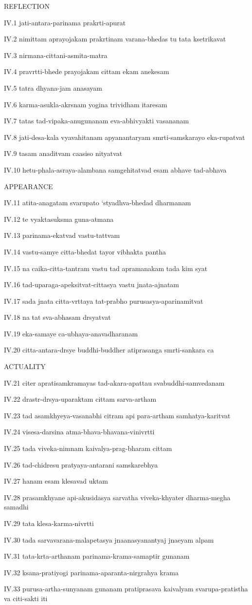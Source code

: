 REFLECTION

IV.1
jati-antara-parinama prakrti-apurat

IV.2
nimittam aprayojakam prakrtinam varana-bhedas tu tata ksetrikavat

IV.3
nirmana-cittani-asmita-matra

IV.4
pravrtti-bhede prayojakam cittam ekam anekesam

IV.5
tatra dhyana-jam anasayam

IV.6
karma-asukla-akrsnam yogina trividham itaresam

IV.7
tatas tad-vipaka-anugunanam eva-abhivyakti vasananam

IV.8
jati-desa-kala vyavahitanam apyanantaryam smrti-samskarayo eka-rupatvat

IV.9
tasam anaditvam caasiso nityatvat

IV.10
hetu-phala-asraya-alambana samgehitatvad esam abhave tad-abhava

APPEARANCE

IV.11
atita-anagatam svarupato ‘styadhva-bhedad dharmanam

IV.12
te vyaktasuksma guna-atmana

IV.13
parinama-ekatvad vastu-tattvam

IV.14
vastu-samye citta-bhedat tayor vibhakta pantha

IV.15
na caika-citta-tantram vastu tad apramanakam tada kim syat

IV.16
tad-uparaga-apeksitvat-cittasya vastu jnata-ajnatam

IV.17
sada jnata citta-vrttaya tat-prabho purusasya-aparinamitvat

IV.18
na tat sva-abhasam drsyatvat

IV.19
eka-samaye ca-ubhaya-anavadharanam

IV.20
citta-antara-drsye buddhi-buddher atiprasanga smrti-sankara ca

ACTUALITY

IV.21
citer apratisamkramayas tad-akara-apattau svabuddhi-samvedanam

IV.22
drastr-drsya-uparaktam cittam sarva-artham

IV.23
tad asamkhyeya-vasanabhi citram api para-artham samhatya-karitvat

IV.24
visesa-darsina atma-bhava-bhavana-vinivrtti

IV.25
tada viveka-nimnam kaivalya-prag-bharam cittam

IV.26
tad-chidresu pratyaya-antarani samskarebhya

IV.27
hanam esam klesavad uktam

IV.28
prasamkhyane api-akusidasya sarvatha viveka-khyater dharma-megha samadhi

IV.29
tata klesa-karma-nivrtti

IV.30
tada sarvavarana-malapetasya jnaanasyanantyaj jnaeyam alpam

IV.31
tata-krta-arthanam parinama-krama-samaptir gunanam

IV.32
ksana-pratiyogi parinama-aparanta-nirgrahya krama

IV.33
purusa-artha-sunyanam gunanam pratiprasava kaivalyam
svarupa-pratistha va citi-sakti iti
